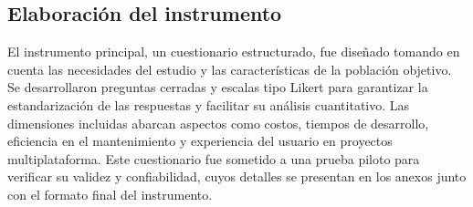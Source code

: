 \subsection{Elaboración del instrumento}
El instrumento principal, un cuestionario estructurado, fue diseñado tomando
en cuenta las necesidades del estudio y las características de la población
objetivo. Se desarrollaron preguntas cerradas y escalas tipo Likert para
garantizar la estandarización de las respuestas y facilitar su análisis
cuantitativo. Las dimensiones incluidas abarcan aspectos como costos,
tiempos de desarrollo, eficiencia en el mantenimiento y experiencia
del usuario en proyectos multiplataforma. Este cuestionario fue
sometido a una prueba piloto para verificar su validez y confiabilidad,
cuyos detalles se presentan en los anexos junto con el formato
final del instrumento.
